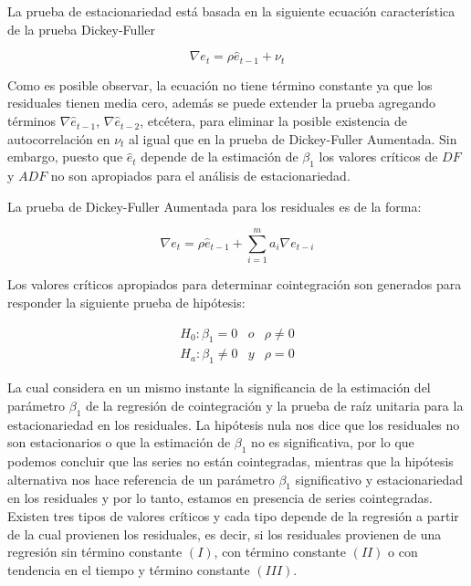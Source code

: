 La prueba de estacionariedad está basada en la siguiente ecuación característica de la prueba Dickey-Fuller

\begin{equation}
\nabla e_t= \rho \hat{e}_{t-1} + \nu_t
\end{equation}

Como es posible observar, la ecuación no tiene término constante ya que los residuales tienen media cero, además se puede extender la prueba agregando términos $\nabla \hat{e}_{t-1}$, $\nabla \hat{e}_{t-2}$, etcétera, para eliminar la posible existencia de autocorrelación en $\nu_t$ al igual que en la prueba de Dickey-Fuller Aumentada. Sin embargo, puesto que $\hat{e}_t$ depende de la estimación de $\beta_1$ los valores críticos de $DF$ y $ADF$ no son apropiados para el análisis de estacionariedad. \bigskip

La prueba de Dickey-Fuller Aumentada para los residuales es de la forma:

\begin{equation}
\nabla e_t= \rho \hat{e}_{t-1} + \sum_{i=1}^{m} a_i \nabla e_{t-i}
\end{equation}

Los valores críticos apropiados para determinar cointegración son generados para responder la siguiente prueba de hipótesis:

   \begin{eqnarray}
    H_0: \beta_1= 0 & o  &  \rho \neq 0   \\ 
    H_a: \beta_1 \neq 0 & y & \rho=0 \nonumber
   \end{eqnarray} 
   
La cual considera en un mismo instante la significancia de la estimación del parámetro $\beta_1$ de la regresión de cointegración y la prueba de raíz unitaria para la estacionariedad en los residuales. La hipótesis nula nos dice que los residuales no son estacionarios o que la estimación de $\beta_1$ no es significativa, por lo que podemos concluir que las series no están cointegradas, mientras que la hipótesis alternativa nos hace referencia de un parámetro $\beta_1$ significativo y estacionariedad en los residuales y por lo tanto, estamos en presencia de series cointegradas. Existen tres tipos de valores críticos y cada tipo depende de la regresión a partir de la cual provienen los residuales, es decir, si los residuales provienen de una regresión sin término constante $(I)$, con término constante $(II)$ o con tendencia en el tiempo y término constante $(III)$. 

